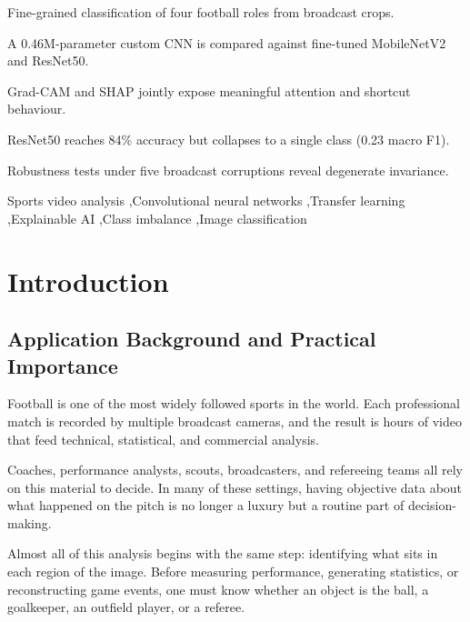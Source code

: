 \documentclass[preprint,12pt]{elsarticle}
\begin{document}
\begin{frontmatter}
\begin{highlights}
\item Fine-grained classification of four football roles from broadcast crops.
\item A 0.46M-parameter custom CNN is compared against fine-tuned MobileNetV2 and ResNet50.
\item Grad-CAM and SHAP jointly expose meaningful attention and shortcut behaviour.
\item ResNet50 reaches 84\% accuracy but collapses to a single class (0.23 macro F1).
\item Robustness tests under five broadcast corruptions reveal degenerate invariance.
\end{highlights}

\begin{keyword}
Sports video analysis \sep Convolutional neural networks \sep Transfer learning \sep Explainable AI \sep Class imbalance \sep Image classification
\end{keyword}

\end{frontmatter}

\linenumbers

\section{Introduction}

\subsection{Application Background and Practical Importance}
Football is one of the most widely followed sports in the world. Each professional match is recorded by multiple broadcast cameras, and the result is hours of video that feed technical, statistical, and commercial analysis.

Coaches, performance analysts, scouts, broadcasters, and refereeing teams all rely on this material to decide. In many of these settings, having objective data about what happened on the pitch is no longer a luxury but a routine part of decision-making.

Almost all of this analysis begins with the same step: identifying what sits in each region of the image. Before measuring performance, generating statistics, or reconstructing game events, one must know whether an object is the ball, a goalkeeper, an outfield player, or a referee.
\end{document}
